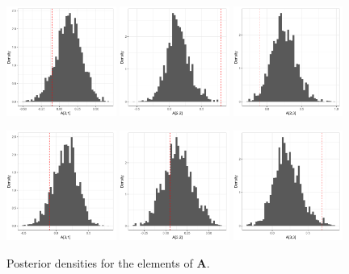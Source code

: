 \begin{figure}[h!]
    \includegraphics[width=0.32\textwidth]{../figures/post_A21.png}
    \includegraphics[width=0.32\textwidth]{../figures/post_A22.png}
    \includegraphics[width=0.32\textwidth]{../figures/post_A23.png}
    
    \includegraphics[width=0.32\textwidth]{../figures/post_A31.png}
    \includegraphics[width=0.32\textwidth]{../figures/post_A32.png}
    \includegraphics[width=0.32\textwidth]{../figures/post_A33.png}
    \caption{Posterior densities for the elements of $\mathbf{A}$.}
\end{figure}